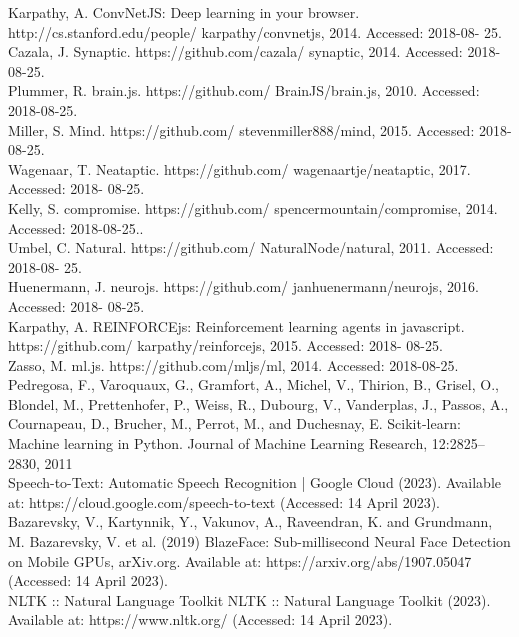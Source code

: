 \documentclass[journal]{IEEEtran}
\begin{document}

\begin{thebibliography}{10}
  Karpathy, A. ConvNetJS: Deep learning in your browser. http://cs.stanford.edu/people/
karpathy/convnetjs, 2014. Accessed: 2018-08-
25.\\
Cazala, J. Synaptic. https://github.com/cazala/
synaptic, 2014. Accessed: 2018-08-25.\\
Plummer, R. brain.js. https://github.com/
BrainJS/brain.js, 2010. Accessed: 2018-08-25.\\
Miller, S. Mind. https://github.com/
stevenmiller888/mind, 2015. Accessed:
2018-08-25.\\
Wagenaar, T. Neataptic. https://github.com/
wagenaartje/neataptic, 2017. Accessed: 2018-
08-25.\\
Kelly, S. compromise. https://github.com/
spencermountain/compromise, 2014. Accessed:
2018-08-25..\\
Umbel, C. Natural. https://github.com/
NaturalNode/natural, 2011. Accessed: 2018-08-
25.\\
Huenermann, J. neurojs. https://github.com/
janhuenermann/neurojs, 2016. Accessed: 2018-
08-25.\\
Karpathy, A. REINFORCEjs: Reinforcement learning
agents in javascript. https://github.com/
karpathy/reinforcejs, 2015. Accessed: 2018-
08-25.\\
Zasso, M. ml.js. https://github.com/mljs/ml,
2014. Accessed: 2018-08-25.\\
Pedregosa, F., Varoquaux, G., Gramfort, A., Michel, V.,
Thirion, B., Grisel, O., Blondel, M., Prettenhofer, P.,
Weiss, R., Dubourg, V., Vanderplas, J., Passos, A., Cournapeau,
D., Brucher, M., Perrot, M., and Duchesnay, E.
Scikit-learn: Machine learning in Python. Journal of
Machine Learning Research, 12:2825–2830, 2011 \\
Speech-to-Text: Automatic Speech Recognition  |  Google Cloud (2023). Available at: https://cloud.google.com/speech-to-text (Accessed: 14 April 2023).\\
Bazarevsky, V., Kartynnik, Y., Vakunov, A., Raveendran, K. and Grundmann, M.
Bazarevsky, V. et al. (2019) BlazeFace: Sub-millisecond Neural Face Detection on Mobile GPUs, arXiv.org. Available at: https://arxiv.org/abs/1907.05047 (Accessed: 14 April 2023).\\
NLTK :: Natural Language Toolkit
NLTK :: Natural Language Toolkit (2023). Available at: https://www.nltk.org/ (Accessed: 14 April 2023).\\





\end{thebibliography}

\vspace{-1cm}
\end{document}
